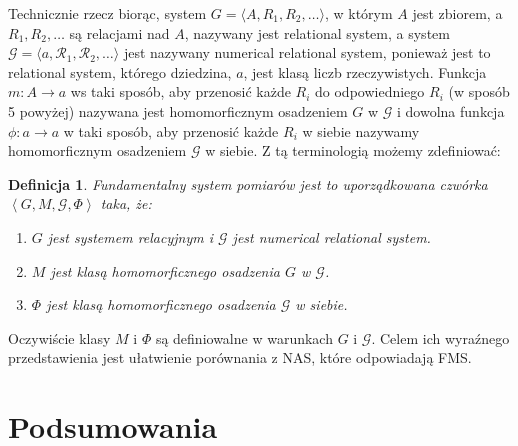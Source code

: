 \documentclass[12pt,a4paper]{report}
\newtheorem{definition}{Definicja}[chapter]
\newcommand{\tuple}[1]{\left\langle {#1} \right\rangle}
\begin{document}
Technicznie rzecz biorąc, system $G = \langle A,R_{1},R_{2},\dots \rangle$, w którym $A$ jest zbiorem, a $R_{1}, R_{2}, \dots$ są relacjami nad $A$, nazywany jest relational system, a system $\mathcal{G} = \langle a, \mathcal{R_{1}},\mathcal{R_{2}}, \dots \rangle$ jest nazywany numerical relational system, ponieważ jest to relational system, którego dziedzina, $a$, jest klasą liczb rzeczywistych. Funkcja $m: A \to a$ ws taki sposób, aby przenosić każde $R_{i}$ do odpowiedniego $R_{i}$ (w sposób 5 powyżej) nazywana jest homomorficznym osadzeniem $G$ w $\mathcal{G}$ i dowolna funkcja $\phi :a \to a$ w taki sposób, aby przenosić każde $R_{i}$ w siebie nazywamy homomorficznym osadzeniem $\mathcal{G}$ w siebie. Z tą terminologią możemy zdefiniować:
\begin{definition}
Fundamentalny system pomiarów jest to uporządkowana czwórka $\tuple{G,M,\mathcal{G},\Phi}$ taka, że:
\begin{enumerate}
\item
$G$ jest systemem relacyjnym i $\mathcal{G}$ jest numerical relational system.
\item
$M$ jest klasą homomorficznego osadzenia $G$ w $\mathcal{G}$.
\item
$\Phi$ jest klasą homomorficznego osadzenia $\mathcal{G}$ w siebie. 
\end{enumerate} 
\end{definition}

Oczywiście klasy $M$ i $\Phi$ są definiowalne w warunkach $G$ i $\mathcal{G}$. Celem ich wyraźnego przedstawienia jest ułatwienie porównania z NAS, które odpowiadają FMS.
\chapter{Podsumowania}


\end{document}
